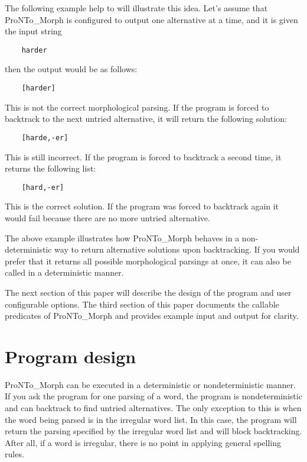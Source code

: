 The following example help to will illustrate this idea.  Let's
assume that ProNTo\_Morph is configured to output one alternative
at a time, and it is given the input string
    \begin{verbatim}
    harder\end{verbatim}

then the output would be as follows:
    \begin{verbatim}
    [harder]\end{verbatim}

This is not the correct morphological parsing. If the program is
forced to backtrack to the next untried alternative, it will
return the following solution:
    \begin{verbatim}
    [harde,-er]\end{verbatim}

This is still incorrect.  If the program is forced to backtrack a
second time, it returns the following list:
    \begin{verbatim}
    [hard,-er]\end{verbatim}

This is the correct solution.  If the program was forced to
backtrack again it would fail because there are no more untried
alternative.\newline

The above example illustrates how ProNTo\_Morph behaves in a
non-deterministic way to return alternative solutions upon
backtracking.  If you would prefer that it returns all possible
morphological parsings at once, it can also be called in a
deterministic manner.\newline

 The next section of this paper will describe the design of
the program and user configurable options.  The third section of
this paper documents the callable predicates of ProNTo\_Morph and
provides example input and output for clarity.


\section{Program design}

ProNTo\_Morph can be executed in a deterministic or
nondeterministic manner.  If you ask the program for one parsing
of a word, the program is nondeterministic and can backtrack to
find untried alternatives.  The only exception to this is when the
word being parsed is in the irregular word list.  In this case,
the program will return the parsing specified by the irregular
word list and will block backtracking.  After all, if a word is
irregular, there is no point in applying general spelling
rules.\newline

